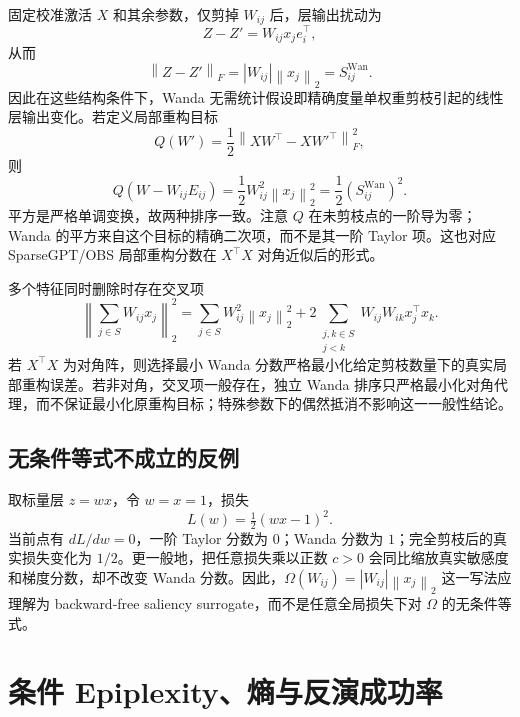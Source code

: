 \documentclass[conference,a4paper]{IEEEtran}
\newcommand{\norm}[1]{\left\lVert #1\right\rVert}
\begin{document}
固定校准激活 $X$ 和其余参数，仅剪掉 $W_{ij}$ 后，层输出扰动为
\begin{equation}
Z-Z'=W_{ij}x_je_i^\top,
\end{equation}
从而
\begin{equation}
\boxed{\norm{Z-Z'}_F=|W_{ij}|\norm{x_j}_2=S^{\mathrm{Wan}}_{ij}.}
\label{eq:exactwanda}
\end{equation}
因此在这些结构条件下，Wanda 无需统计假设即精确度量单权重剪枝引起的线性层输出变化。若定义局部重构目标
\begin{equation}
Q(W')=\frac12\norm{XW^\top-XW'^\top}_F^2,
\end{equation}
则
\begin{equation}
Q(W-W_{ij}E_{ij})=\frac12W_{ij}^2\norm{x_j}_2^2
=\frac12(S^{\mathrm{Wan}}_{ij})^2.
\end{equation}
平方是严格单调变换，故两种排序一致。注意 $Q$ 在未剪枝点的一阶导为零；Wanda 的平方来自这个目标的精确二次项，而不是其一阶 Taylor 项。这也对应 SparseGPT/OBS 局部重构分数在 $X^\top X$ 对角近似后的形式\cite{frantar2023sparsegpt,sun2024wanda}。

多个特征同时删除时存在交叉项
\begin{equation}
\norm{\sum_{j\in S}W_{ij}x_j}_2^2
=\sum_{j\in S}W_{ij}^2\norm{x_j}_2^2
+2\!\sum_{\substack{j,k\in S\\j<k}}W_{ij}W_{ik}x_j^\top x_k.
\end{equation}
若 $X^\top X$ 为对角阵，则选择最小 Wanda 分数严格最小化给定剪枝数量下的真实局部重构误差。若非对角，交叉项一般存在，独立 Wanda 排序只严格最小化对角代理，而不保证最小化原重构目标；特殊参数下的偶然抵消不影响这一一般性结论。

\subsection{无条件等式不成立的反例}

取标量层 $z=wx$，令 $w=x=1$，损失
\begin{equation}
L(w)=\tfrac12(wx-1)^2.
\end{equation}
当前点有 $dL/dw=0$，一阶 Taylor 分数为 $0$；Wanda 分数为 $1$；完全剪枝后的真实损失变化为 $1/2$。更一般地，把任意损失乘以正数 $c>0$ 会同比缩放真实敏感度和梯度分数，却不改变 Wanda 分数。因此，$\Omega(W_{ij})=|W_{ij}|\norm{x_j}_2$ 这一写法应理解为 backward-free saliency surrogate，而不是任意全局损失下对 $\Omega$ 的无条件等式。

\section{条件 Epiplexity、熵与反演成功率}
\end{document}
